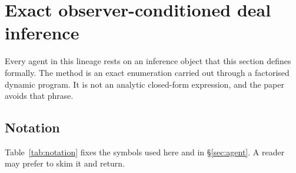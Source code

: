 \section{Exact observer-conditioned deal inference}
\label{sec:inference}

Every agent in this lineage rests on an inference object that this section defines formally. The
method is an exact enumeration carried out through a factorised dynamic program. It is not an
analytic closed-form expression, and the paper avoids that phrase.

\subsection{Notation}
\label{sec:inference-notation}

Table~\ref{tab:notation} fixes the symbols used here and in \S\ref{sec:agent}. A reader may prefer to
skim it and return.


